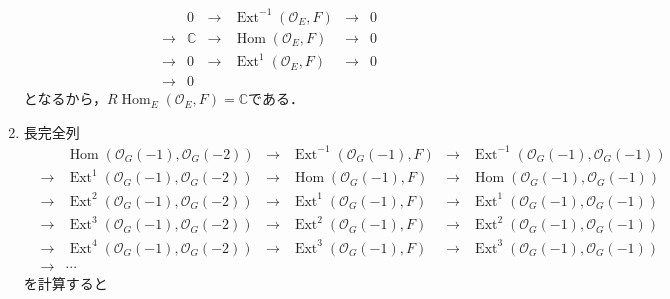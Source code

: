\documentclass[uplatex,a4paper,11pt,dvipdfmx]{jsarticle}
\makeatletter
\theoremstyle{mystyle} %
\renewenvironment{proof}[1][\proofname]{\par
 \pushQED{\qed}%
 \normalfont \topsep6\p@\@plus6\p@\relax
 \trivlist
 \item[\hskip\labelsep
 \itshape
 {\bf\underline{#1}}]\ignorespaces
}{%
 \popQED\endtrivlist\@endpefalse
}
\DeclareMathOperator{\Hom}{Hom}
\DeclareMathOperator{\Ext}{Ext}
\makeatother
\begin{document}
\begin{proof}
\begin{enumerate}
\[\begin{array}{ccccccc}
				       &     & 0          & \to & \Ext^{-1}(\mathcal{O}_E, F) & \to & 0 \\
				       & \to & \mathbb{C} & \to & \Hom(\mathcal{O}_E, F)      & \to & 0 \\
				       & \to & 0          & \to & \Ext^1(\mathcal{O}_E,F)     & \to & 0 \\
				       & \to & 0          &     &                             &     &
			      \end{array}
		      \]となるから，$R\Hom_E(\mathcal{O}_E, F) = \mathbb{C}$である．
		\item 長完全列\[
			      \begin{array}{ccccccc}

				       &     & \Hom(\mathcal{O}_G(-1), \mathcal{O}_G(-2))    & \to & \Ext^{-1}(\mathcal{O}_G(-1), F) & \to & \Ext^{-1}(\mathcal{O}_G(-1), \mathcal{O}_G(-1)) \\
				       & \to & \Ext^1(\mathcal{O}_G(-1), \mathcal{O}_G(-2))  & \to & \Hom(\mathcal{O}_G(-1), F)      & \to & \Hom(\mathcal{O}_G(-1), \mathcal{O}_G(-1))      \\
				       & \to & \Ext^2(\mathcal{O}_G(-1), \mathcal{O}_G(-2))  & \to & \Ext^1(\mathcal{O}_G(-1),F)     & \to & \Ext^1(\mathcal{O}_G(-1), \mathcal{O}_G(-1))    \\
				       & \to & \Ext^3(\mathcal{O}_G(-1), \mathcal{O}_G(-2) ) & \to & \Ext^2(\mathcal{O}_G(-1),F)     & \to & \Ext^2(\mathcal{O}_G(-1), \mathcal{O}_G(-1))    \\
				       & \to & \Ext^4(\mathcal{O}_G(-1), \mathcal{O}_G(-2) ) & \to & \Ext^3(\mathcal{O}_G(-1),F)     & \to & \Ext^3(\mathcal{O}_G(-1), \mathcal{O}_G(-1))    \\
				       & \to & \cdots                                        &     &                                 &
			      \end{array}
		      \]を計算すると\[
			      \begin{array}{ccccccc}


\end{array}\]
\end{enumerate}
\end{proof}
\end{document}

